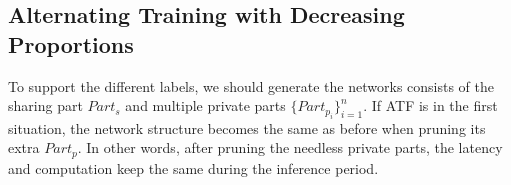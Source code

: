 \documentclass[journal,transmag]{IEEEtran}
\begin{document}

\subsection{Alternating Training with Decreasing Proportions}
\label{subsec:ATDP}

To support the different labels, we should generate the networks consists of the sharing part $Part_s$ and multiple private parts $\{ Part_{p_i} \}_{i=1}^n$. 
If ATF is in the first situation, the network structure becomes the same as before when pruning its extra $Part_p$. 
In other words, after pruning the needless private parts, the latency and computation keep the same during the inference period.
\end{document}
